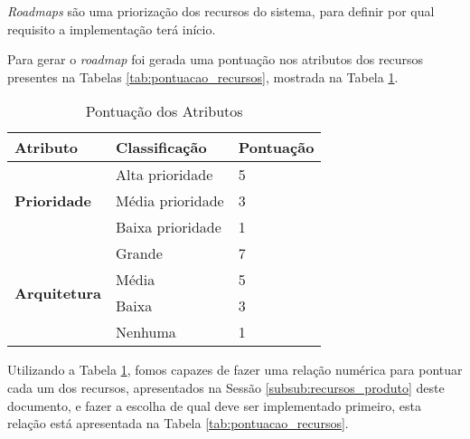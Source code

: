 
\textit{Roadmaps} são uma priorização dos recursos do sistema, para definir por qual requisito a implementação terá início.

Para gerar o \textit{roadmap} foi gerada uma pontuação nos atributos dos recursos presentes na Tabelas \ref{tab:pontuacao_recursos}, mostrada na Tabela \ref{tab:pontuacao_atributos}.

\begin{table}[H]
\centering
\begin{tabular}{|p{2cm}|p{5cm}|p{3cm}|}

\hline
\textbf{Atributo} &
\textbf{Classificação} &
\textbf{Pontuação}
\\ \hline

\multirow{3}{*}{
\textbf{Prioridade}} &
	Alta prioridade &
	5
	\\ \cline{2-3} &
	Média prioridade  &
	3
	\\ \cline{2-3} &
	Baixa prioridade  &
	1
	\\ \hline

\multirow{4}{*}{\textbf{Arquitetura}} &
	Grande &
	7
	\\ \cline{2-3} &
	Média &
	5
	\\ \cline{2-3} &
	Baixa &
	3
	\\ \cline{2-3} &
	Nenhuma &
	1
	\\ \hline
\end{tabular}
\caption{Pontuação dos Atributos}
\label{tab:pontuacao_atributos}
\end{table}

Utilizando a Tabela \ref{tab:pontuacao_atributos}, fomos capazes de fazer uma relação numérica para pontuar cada um dos recursos, apresentados na Sessão \ref{subsub:recursos_produto} deste documento, e fazer a escolha de qual deve ser implementado primeiro, esta relação está apresentada na Tabela \ref{tab:pontuacao_recursos}.

